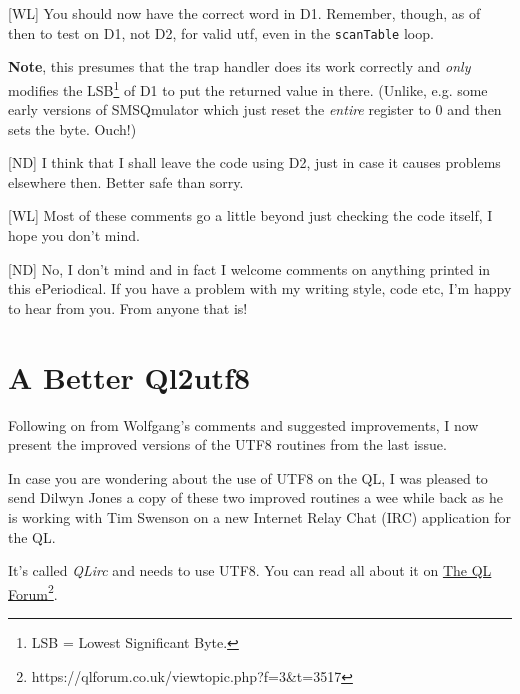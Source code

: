 [WL] You should now have the correct word in D1. Remember, though, as of then to test on D1, not D2, for valid utf, even in the \texttt{scanTable} loop.

\textbf{Note}, this presumes that the trap handler does its work correctly and \emph{only} modifies the LSB\footnote{LSB = Lowest Significant Byte.} of D1 to put the returned value in there. (Unlike, e.g. some early versions of SMSQmulator which just reset the \emph{entire} register to 0 and then sets the byte. Ouch!)

[ND] I think that I shall leave the code using D2, just in case it causes problems elsewhere then. Better safe than sorry.
	
[WL] Most of these comments go a little beyond just checking the code itself, I hope you don't mind.

[ND] No, I don't mind and in fact I welcome comments on anything printed in this ePeriodical. If you have a problem with my writing style, code etc, I'm happy to hear from you. From anyone that is!

\section{A Better Ql2utf8}

Following on from Wolfgang's comments and suggested improvements, I now present the improved versions of the UTF8 routines from the last issue. 

In case you are wondering about the use of UTF8 on the QL, I was pleased to send Dilwyn Jones a copy of these two improved routines a wee while back as he is working with Tim Swenson on a new Internet Relay Chat (IRC) application for the QL. 

It's called \emph{QLirc} and needs to use UTF8. You can read all about it on \href{https://qlforum.co.uk/viewtopic.php?f=3\&t=3517}{The QL Forum}\footnote{https://qlforum.co.uk/viewtopic.php?f=3\&t=3517}.

